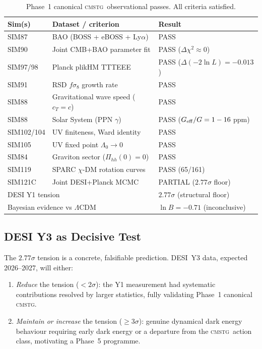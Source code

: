 \documentclass[12pt,a4paper]{article}
\newcommand{\CMSTG}{\textsc{cmstg}}
\newcommand{\Lz}{\Lambda_0}
\theoremstyle{plain}
\begin{document}
\begin{table}[h!]
\centering
\caption{Phase~1 canonical \CMSTG\ observational passes. All criteria satisfied.}
\label{tab:all-passes}
\setlength{\tabcolsep}{5pt}
\begin{tabular}{lll}
\toprule
Sim(s) & Dataset / criterion & Result \\
\midrule
SIM87        & BAO (BOSS + eBOSS + Ly$\alpha$)          & PASS \\
SIM90        & Joint CMB+BAO parameter fit               & PASS ($\Delta\chi^2\approx0$) \\
SIM97/98     & Planck plikHM TTTEEE                      & PASS ($\Delta(-2\ln L)=-0.013$) \\
SIM91        & RSD $f\sigma_8$ growth rate               & PASS \\
SIM88        & Gravitational wave speed ($c_T=c$)        & PASS \\
SIM88        & Solar System (PPN $\gamma$)               & PASS ($G_{\rm eff}/G=1-16\;$ppm) \\
SIM102/104   & UV finiteness, Ward identity              & PASS \\
SIM105       & UV fixed point $\Lz\to0$                  & PASS \\
SIM84        & Graviton sector ($\Pi_{hh}(0)=0$)         & PASS \\
SIM119       & SPARC $\chi$-DM rotation curves           & PASS (65/161) \\
SIM121C      & Joint DESI+Planck MCMC                    & PARTIAL ($2.77\sigma$ floor) \\
\midrule
\multicolumn{2}{l}{DESI Y1 tension}                     & $2.77\sigma$ (structural floor) \\
\multicolumn{2}{l}{Bayesian evidence vs $\Lambda$CDM}   & $\ln B=-0.71$ (inconclusive) \\
\bottomrule
\end{tabular}
\end{table}

\subsection{DESI Y3 as Decisive Test}

The $2.77\sigma$ tension is a concrete, falsifiable prediction. DESI~Y3 data,
expected 2026--2027, will either:
\begin{enumerate}
  \item \emph{Reduce} the tension ($<2\sigma$): the Y1 measurement had
    systematic contributions resolved by larger statistics, fully validating
    Phase~1 canonical \CMSTG.
  \item \emph{Maintain or increase} the tension ($\geq3\sigma$): genuine
    dynamical dark energy behaviour requiring early dark energy or a departure
    from the \CMSTG\ action class, motivating a Phase~5 programme.
\end{enumerate}
\end{document}
